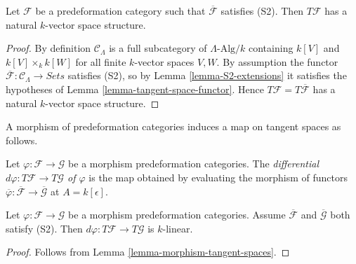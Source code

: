 \begin{lemma}
\label{lemma-tangent-space-vector-space}
Let $\mathcal{F}$ be a predeformation category such that
$\overline{\mathcal{F}}$ 
satisfies (S2). Then $T \mathcal{F}$ has a natural $k$-vector space 
structure.
\end{lemma}

\begin{proof}
By definition $\mathcal{C}_\Lambda$ is a full subcategory of 
$\Lambda\text{-Alg}/k$ containing $k[V]$ and $k[V] \times_{k} k[W]$ for 
all finite $k$-vector spaces $V,W$.  By assumption the functor 
$\overline{\mathcal{F}}: \mathcal{C}_\Lambda \to \textit{Sets}$ 
satisfies (S2), so by Lemma \ref{lemma-S2-extensions} it satisfies the 
hypotheses of Lemma \ref{lemma-tangent-space-functor}.  Hence
$T \mathcal{F} = T \overline{\mathcal{F}}$ has a natural $k$-vector
space structure.
\end{proof}

\noindent
A morphism of predeformation categories induces a map on tangent spaces as 
follows.

\begin{definition}
\label{definition-differential}
Let $\varphi: \mathcal{F} \to \mathcal{G}$ be a morphism predeformation 
categories. The {\it differential $d \varphi: T \mathcal{F} \to T 
\mathcal{G}$ of $\varphi$} is the map obtained by evaluating the morphism of 
functors $\overline{\varphi}: \overline{\mathcal{F}} \to  
\overline{\mathcal{G}}$ at $A = k[\epsilon]$.
\end{definition}

\begin{lemma}
\label{lemma-k-linear-differential}
Let $\varphi: \mathcal{F} \to \mathcal{G}$ be a morphism predeformation 
categories. Assume $\overline{\mathcal{F}}$ and $\overline{\mathcal{G}}$ both 
satisfy (S2).  Then $d \varphi: T \mathcal{F} \to T 
\mathcal{G}$ is $k$-linear.
\end{lemma}

\begin{proof}
Follows from Lemma \ref{lemma-morphism-tangent-spaces}.
\end{proof}

